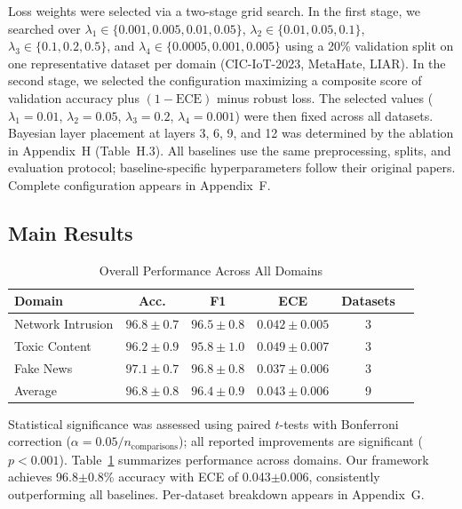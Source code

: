 \documentclass[12pt,a4paper]{article}
\theoremstyle{definition}
\begin{document}
Loss weights were selected via a two-stage grid search. In the first stage, we searched over $\lambda_1 \in \{0.001, 0.005, 0.01, 0.05\}$, $\lambda_2 \in \{0.01, 0.05, 0.1\}$, $\lambda_3 \in \{0.1, 0.2, 0.5\}$, and $\lambda_4 \in \{0.0005, 0.001, 0.005\}$ using a 20\% validation split on one representative dataset per domain (CIC-IoT-2023, MetaHate, LIAR). In the second stage, we selected the configuration maximizing a composite score of validation accuracy plus $(1-\text{ECE})$ minus robust loss. The selected values ($\lambda_1{=}0.01$, $\lambda_2{=}0.05$, $\lambda_3{=}0.2$, $\lambda_4{=}0.001$) were then fixed across all datasets. Bayesian layer placement at layers 3, 6, 9, and 12 was determined by the ablation in Appendix~H (Table~H.3). All baselines use the same preprocessing, splits, and evaluation protocol; baseline-specific hyperparameters follow their original papers. Complete configuration appears in Appendix~F.

\subsection{Main Results}

\begin{table}[t]
\caption{Overall Performance Across All Domains}
\label{tab:overall}
\centering
\small
\setlength{\tabcolsep}{4pt}
\begin{tabular}{@{}lccccc@{}}
\toprule
Domain & Acc. & F1 & ECE & Datasets\\
\midrule
Network Intrusion & $96.8 \pm 0.7$ & $96.5 \pm 0.8$ & $0.042 \pm 0.005$ & 3 \\
Toxic Content     & $96.2 \pm 0.9$ & $95.8 \pm 1.0$ & $0.049 \pm 0.007$ & 3 \\
Fake News         & $97.1 \pm 0.7$ & $96.8 \pm 0.8$ & $0.037 \pm 0.006$ & 3 \\
\midrule
Average  & $96.8 \pm 0.8$ & $96.4 \pm 0.9$ & $0.043 \pm 0.006$ & 9 \\
\bottomrule
\end{tabular}
\end{table}

Statistical significance was assessed using paired $t$-tests with Bonferroni correction ($\alpha = 0.05/n_{\text{comparisons}}$); all reported improvements are significant ($p < 0.001$). Table~\ref{tab:overall} summarizes performance across domains. Our framework achieves 96.8$\pm$0.8\% accuracy with ECE of 0.043$\pm$0.006, consistently outperforming all baselines. Per-dataset breakdown appears in Appendix~G.
\end{document}
